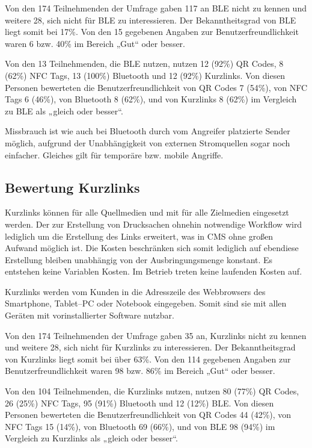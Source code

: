 Von den 174 Teilnehmenden der Umfrage gaben 117 an \ac{BLE} nicht zu kennen und weitere 28, sich nicht für \ac{BLE} zu interessieren. Der Bekanntheitsgrad von \ac{BLE} liegt somit bei 17\%. Von den 15 gegebenen Angaben zur Benutzerfreundlichkeit waren 6 bzw. 40\% im Bereich „Gut“ oder besser.

Von den 13 Teilnehmenden, die \ac{BLE} nutzen, nutzen 12 (92\%) QR Codes, 8 (62\%) NFC Tags, 13 (100\%) Bluetooth und 12 (92\%) Kurzlinks. Von diesen Personen bewerteten die  Benutzerfreundlichkeit von QR Codes 7 (54\%), von NFC Tags 6 (46\%), von Bluetooth 8 (62\%), und von Kurzlinks 8 (62\%) im Vergleich zu \ac{BLE} als „gleich oder besser“.

Missbrauch ist wie auch bei Bluetooth durch vom Angreifer platzierte Sender möglich, aufgrund der Unabhängigkeit von externen Stromquellen sogar noch einfacher. Gleiches gilt für temporäre bzw. mobile Angriffe.

\subsection{Bewertung Kurzlinks} %
\label{sub:bewertung_kurzlinks}
Kurzlinks können für alle Quellmedien und mit für alle Zielmedien eingesetzt werden. Der zur Erstellung von Drucksachen ohnehin notwendige Workflow wird lediglich um die Erstellung des Links erweitert, was in \ac{CMS} ohne großen Aufwand möglich ist. Die Kosten beschränken sich somit lediglich auf ebendiese Erstellung bleiben unabhängig von der Ausbringungsmenge konstant. Es entstehen keine Variablen Kosten. Im Betrieb treten keine laufenden Kosten auf.

Kurzlinks werden vom Kunden in die Adresszeile des Webbrowsers des Smartphone, Tablet–PC oder Notebook eingegeben. Somit sind sie mit allen Geräten mit vorinstallierter Software nutzbar. 

Von den 174 Teilnehmenden der Umfrage gaben 35 an, Kurzlinks nicht zu kennen und weitere 28, sich nicht für Kurzlinks zu interessieren. Der Bekanntheitsgrad von Kurzlinks liegt somit bei über 63\%. Von den 114 gegebenen Angaben zur Benutzerfreundlichkeit waren 98 bzw. 86\% im Bereich „Gut“ oder besser. 

Von den 104 Teilnehmenden, die Kurzlinks nutzen, nutzen 80 (77\%) QR Codes, 26 (25\%) NFC Tags, 95 (91\%) Bluetooth und 12 (12\%) \ac{BLE}. Von diesen Personen bewerteten die  Benutzerfreundlichkeit von QR Codes 44 (42\%), von NFC Tags 15 (14\%), von Bluetooth 69 (66\%), und von \ac{BLE} 98 (94\%) im Vergleich zu Kurzlinks als „gleich oder besser“.

